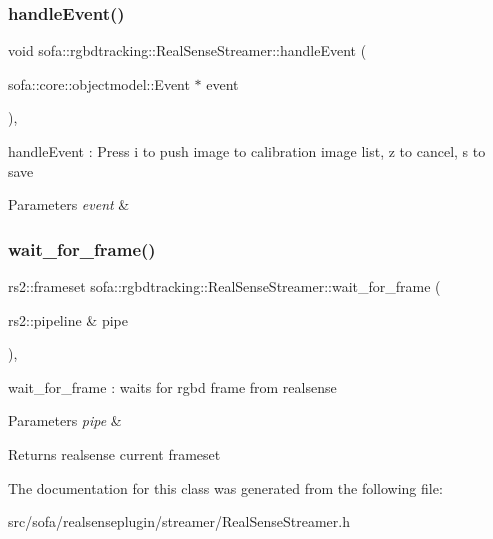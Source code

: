 \subsubsection{\texorpdfstring{handle\+Event()}{handleEvent()}}
{\footnotesize\ttfamily void sofa\+::rgbdtracking\+::\+Real\+Sense\+Streamer\+::handle\+Event (\begin{DoxyParamCaption}\item[{sofa\+::core\+::objectmodel\+::\+Event $\ast$}]{event }\end{DoxyParamCaption})\hspace{0.3cm}{\ttfamily [inline]}, {\ttfamily [override]}}



handle\+Event \+: Press i to push image to calibration image list, z to cancel, s to save 


\begin{DoxyParams}{Parameters}
{\em event} & \\
\hline
\end{DoxyParams}
\mbox{\label{classsofa_1_1rgbdtracking_1_1_real_sense_streamer_a3ea622968695865d727d67b72e8363c7}} 
\subsubsection{\texorpdfstring{wait\+\_\+for\+\_\+frame()}{wait\_for\_frame()}}
{\footnotesize\ttfamily rs2\+::frameset sofa\+::rgbdtracking\+::\+Real\+Sense\+Streamer\+::wait\+\_\+for\+\_\+frame (\begin{DoxyParamCaption}\item[{rs2\+::pipeline \&}]{pipe }\end{DoxyParamCaption})\hspace{0.3cm}{\ttfamily [inline]}, {\ttfamily [protected]}}



wait\+\_\+for\+\_\+frame \+: waits for rgbd frame from realsense 


\begin{DoxyParams}{Parameters}
{\em pipe} & \\
\hline
\end{DoxyParams}
\begin{DoxyReturn}{Returns}
realsense current frameset 
\end{DoxyReturn}


The documentation for this class was generated from the following file\+:\begin{DoxyCompactItemize}
\item 
src/sofa/realsenseplugin/streamer/Real\+Sense\+Streamer.\+h\end{DoxyCompactItemize}
